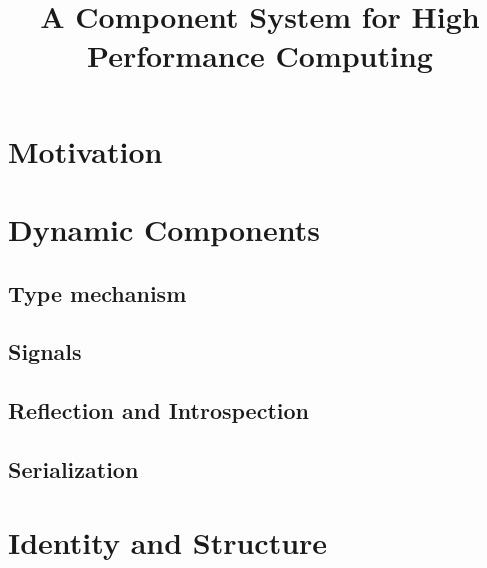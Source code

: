 \documentclass[12pt]{scrartcl}
\title{A Component System for High Performance Computing}
\author{}
\begin{document}
\maketitle

\tableofcontents


\section{Motivation} 



\section{Dynamic Components} 


\subsection{Type mechanism}





\subsection{Signals}


\subsection{Reflection and Introspection}

\subsection{Serialization} %


\section{Identity and Structure} 
\end{document}
